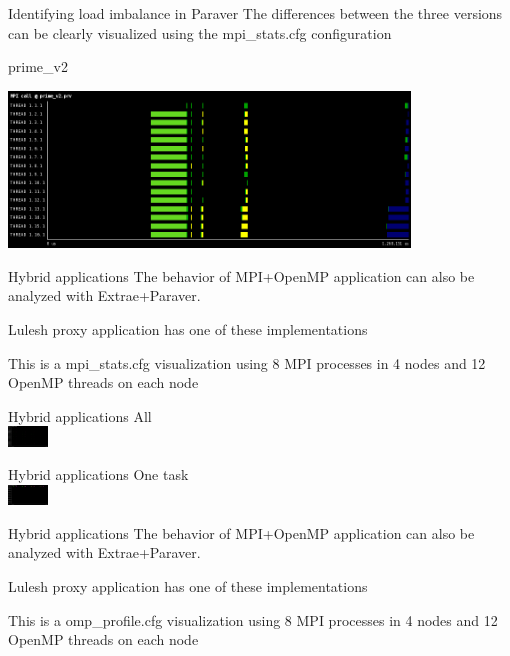 \documentclass[10pt,xcolor=table]{beamer}
\begin{document}
\begin{frame}{Identifying load imbalance in Paraver}
The differences between the three versions can be clearly visualized using the mpi\_stats.cfg configuration

\centering
prime\_v2

\includegraphics[width=0.8\textwidth]{figs/MPI_call@prime_v2.png}

    
\end{frame}

\begin{frame}{Hybrid applications}
The behavior of MPI+OpenMP application can also be analyzed with Extrae+Paraver.

Lulesh proxy application has one of these implementations

This is a mpi\_stats.cfg visualization using 8 MPI processes in 4 nodes and 12 OpenMP threads on each node

\end{frame}

\begin{frame}{Hybrid applications}
\vspace{30ex}
All\\
\includegraphics[width=0.08\textwidth]{figs/MPI_call@luleshMPI_OMP.chop1.png}
\end{frame}

\begin{frame}{Hybrid applications}
\vspace{30ex}
One task\\
\includegraphics[width=0.08\textwidth]{figs/MPI_call@luleshMPI_OMP.chop1onetask.png}
\end{frame}


\begin{frame}{Hybrid applications}
The behavior of MPI+OpenMP application can also be analyzed with Extrae+Paraver.

Lulesh proxy application has one of these implementations

This is a omp\_profile.cfg visualization using 8 MPI processes in 4 nodes and 12 OpenMP threads on each node
\end{frame}
\end{document}

